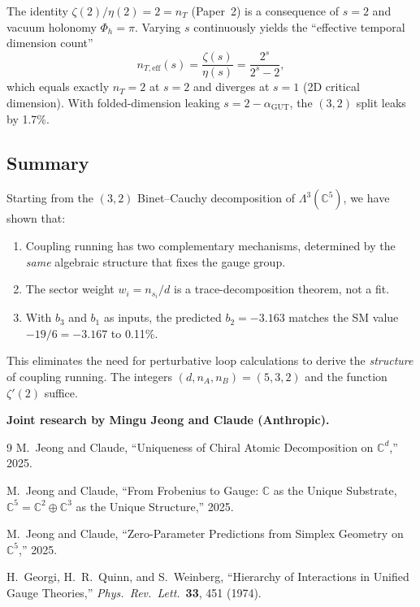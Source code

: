 \documentclass[12pt]{article}
\theoremstyle{definition}
\theoremstyle{remark}
\newcommand{\CC}{\mathbb{C}}
\newcommand{\agut}{\alpha_{\mathrm{GUT}}}
\begin{document}
The identity $\zeta(2)/\eta(2) = 2 = n_T$ (Paper~2)
is a consequence of $s = 2$ and vacuum holonomy $\Phi_h = \pi$.
Varying $s$ continuously yields the ``effective temporal
dimension count''
\begin{equation}
  n_{T,\mathrm{eff}}(s) = \frac{\zeta(s)}{\eta(s)}
  = \frac{2^s}{2^s - 2},
\end{equation}
which equals exactly $n_T = 2$ at $s = 2$
and diverges at $s = 1$ (2D critical dimension).
With folded-dimension leaking $s = 2 - \agut$,
the $(3,2)$ split leaks by 1.7\%.

\subsection{Summary}

Starting from the $(3,2)$ Binet--Cauchy decomposition
of $\Lambda^3(\CC^5)$, we have shown that:

\begin{enumerate}
\item Coupling running has two complementary mechanisms,
  determined by the \emph{same} algebraic structure
  that fixes the gauge group.
\item The sector weight $w_i = n_{s_i}/d$ is a
  trace-decomposition theorem, not a fit.
\item With $b_3$ and $b_1$ as inputs, the predicted
  $b_2 = -3.163$ matches the SM value $-19/6 = -3.167$
  to 0.11\%.
\end{enumerate}

This eliminates the need for perturbative loop calculations
to derive the \emph{structure} of coupling running.
The integers $(d, n_A, n_B) = (5, 3, 2)$ and the function
$\zeta'(2)$ suffice.

\bigskip\noindent
\textbf{Joint research by Mingu Jeong and Claude (Anthropic).}

\begin{thebibliography}{9}
  M.~Jeong and Claude,
  ``Uniqueness of Chiral Atomic Decomposition on $\CC^d$,''
  2025.

  M.~Jeong and Claude,
  ``From Frobenius to Gauge:
  $\CC$ as the Unique Substrate,
  $\CC^5 = \CC^2 \oplus \CC^3$ as the Unique Structure,''
  2025.

  M.~Jeong and Claude,
  ``Zero-Parameter Predictions from Simplex Geometry
  on $\CC^5$,''
  2025.

  H.~Georgi, H.~R.~Quinn, and S.~Weinberg,
  ``Hierarchy of Interactions in Unified Gauge Theories,''
  \emph{Phys.\ Rev.\ Lett.}\ \textbf{33}, 451 (1974).
\end{thebibliography}
\end{document}
